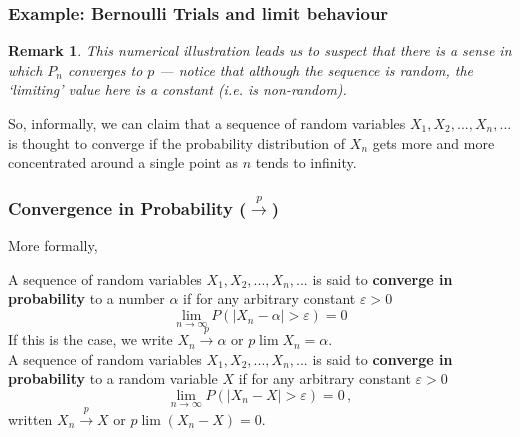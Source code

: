 \documentclass[notes=show,smaller,handout]{beamer}\usepackage[]{graphicx}\usepackage[]{color}
\newtheorem{remark}{Remark}[section]
\renewcommand{\Pr}{P}
\begin{document}
\begin{frame}%

\frametitle{Example: Bernoulli Trials and limit behaviour}

\begin{remark}
This numerical illustration leads us to suspect that there is a sense in which ${P}_n$ converges to $p$ --- notice that although the sequence is random, the `limiting' value here is a constant (i.e. is non-random).
\end{remark}

\vspace{1.5cm}

So, informally, we can claim that a sequence of random variables $X_{1},X_{2},...,X_{n},...$ is thought to
converge if the probability distribution of $X_{n}$ gets more and more concentrated around a single point as $n$ tends to infinity.
\end{frame}


\begin{frame}%

\frametitle{Convergence in Probability ($\overset{p}{\rightarrow }$)}

More formally,

\begin{definition}
A sequence of random variables $X_{1},X_{2},...,X_{n},...$ is said to \textbf{%
converge in probability} to a number $\alpha $ if for any arbitrary constant $\varepsilon >0$%
\begin{equation*}
\lim_{n\rightarrow \infty }\Pr \left( \left\vert X_{n}-\alpha \right\vert
>\varepsilon \right) =0
\end{equation*}
If this is the case, we write $X_{n}\overset{p}{\rightarrow }\alpha$ or $p\lim X_{n}=\alpha$. \\
\vspace{0.3cm}
A sequence of random variables $X_{1},X_{2},...,X_{n},...$ is said to \textbf{%
converge in probability} to a random variable $X$ if for any arbitrary constant $\varepsilon >0$%
\begin{equation*}
\lim_{n\rightarrow \infty }\Pr \left( \left\vert X_{n}-X \right\vert
>\varepsilon \right) =0\,,
\end{equation*}
written $X_{n}\overset{p}{\rightarrow }X$ or $p\lim(X_{n}-X)=0$.
\end{definition}
\end{frame}%
\end{document}
